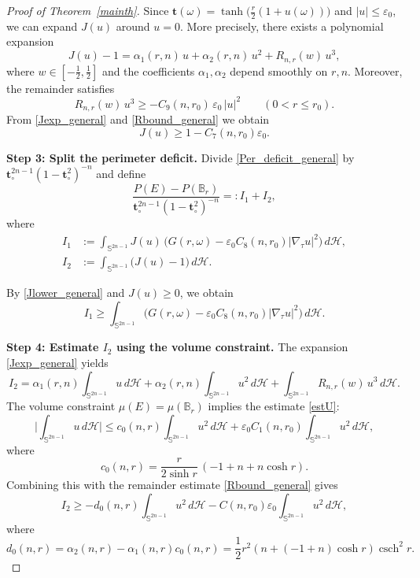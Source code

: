 \documentclass[10pt,a4paper]{amsart}
\newcommand{\csch}{\operatorname{csch}}
\def\ge{\geqslant}
\begin{document}
\begin{proof}[Proof of Theorem~\ref{mainth}]
Since $\mathbf t(\omega)=\tanh\!\big(\frac r2(1+u(\omega))\big)$ and $|u|\le \varepsilon_0$,
we can expand $J(u)$ around $u=0$. More precisely, there exists a polynomial expansion
\begin{equation}\label{Jexp_general}
J(u)-1 = \alpha_1(r,n)\,u + \alpha_2(r,n)\,u^2 + R_{n,r}(w)\,u^3,
\end{equation}
where $w\in[-\frac12,\frac12]$ and the coefficients $\alpha_1,\alpha_2$ depend smoothly on $r,n$.
Moreover, the remainder satisfies
\begin{equation}\label{Rbound_general}
R_{n,r}(w)\,u^3 \ge -C_9(n,r_0)\,\varepsilon_0\,|u|^2
\qquad (0<r\le r_0).
\end{equation}
From \eqref{Jexp_general} and \eqref{Rbound_general} we obtain
\begin{equation}\label{Jlower_general}
J(u)\ge 1-C_7(n,r_0)\varepsilon_0.
\end{equation}

\medskip

\noindent\textbf{Step 3: Split the perimeter deficit.}
Divide \eqref{Per_deficit_general} by $\mathbf t_\circ^{2n-1}(1-\mathbf t_\circ^2)^{-n}$
and define
\[
\frac{P(E)-P(\mathbb B_r)}{\mathbf t_\circ^{2n-1}(1-\mathbf t_\circ^2)^{-n}}=:I_1+I_2,
\]
where
\begin{align*}
I_1
&:=\int_{\mathbb S^{2n-1}}J(u)\,
\Big(G(r,\omega)-\varepsilon_0 C_8(n,r_0)|\nabla_\tau u|^2\Big)\,d\mathcal H,
\\
I_2
&:=\int_{\mathbb S^{2n-1}}\big(J(u)-1\big)\,d\mathcal H.
\end{align*}

By \eqref{Jlower_general} and $J(u)\ge 0$, we obtain
\begin{equation}\label{I1lower_general}
I_1 \ge \int_{\mathbb S^{2n-1}}
\Big(G(r,\omega)-\varepsilon_0 C_8(n,r_0)|\nabla_\tau u|^2\Big)\,d\mathcal H.
\end{equation}

\medskip

\noindent\textbf{Step 4: Estimate $I_2$ using the volume constraint.}
The expansion \eqref{Jexp_general} yields
\[
I_2 = \alpha_1(r,n)\int_{\mathbb S^{2n-1}}u\,d\mathcal H
+\alpha_2(r,n)\int_{\mathbb S^{2n-1}}u^2\,d\mathcal H
+\int_{\mathbb S^{2n-1}}R_{n,r}(w)\,u^3\,d\mathcal H.
\]
The volume constraint $\mu(E)=\mu(\mathbb B_r)$ implies the estimate \eqref{estU}:
\[
\Big|\int_{\mathbb S^{2n-1}}u\,d\mathcal H\Big|
\le c_0(n,r)\int_{\mathbb S^{2n-1}}u^2\,d\mathcal H
+\varepsilon_0C_1(n,r_0)\int_{\mathbb S^{2n-1}}u^2\,d\mathcal H,
\]
where
\[
c_0(n,r)=\frac{r}{2\sinh r}\,(-1+n+n\cosh r).
\]
Combining this with the remainder estimate \eqref{Rbound_general} gives
\begin{equation}\label{I2lower_general}
I_2 \ge -d_0(n,r)\int_{\mathbb S^{2n-1}}u^2\,d\mathcal H
-C(n,r_0)\varepsilon_0\int_{\mathbb S^{2n-1}}u^2\,d\mathcal H,
\end{equation}
where $$d_0(n,r) = \alpha_2(n,r) - \alpha_1(n,r) c_0(n,r) = \frac{1}{2}r^{2}\left(n+(-1+n)\cosh r\right)\csch^{2}r.
$$
\medskip


\end{proof}
\end{document}
